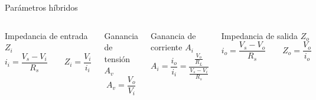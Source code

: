 \begin{frame}{Parámetros híbridos}
    \begin{columns}[t]
      \begin{block}{Impedancia de entrada $Z_i$}
        \[
          i_i = \frac{V_s - V_i}{R_s}
          \qquad
          Z_i = \frac{V_i}{i_i}
        \]
      \end{block}
    
      \begin{block}{Ganancia de tensión $A_v$}
        \[
          A_v = \frac{V_o}{V_i}
        \]
      \end{block}
    
      \begin{block}{Ganancia de corriente $A_i$}
        \[
          A_i = \frac{i_o}{i_i}
          = \frac{\tfrac{V_o}{R_L}}{\tfrac{V_s - V_i}{R_s}}
        \]
      \end{block}
    
      \begin{block}{Impedancia de salida $Z_o$}
        \[
          i_o = \frac{V_s - V_o}{R_s}
          \qquad
          Z_o = \frac{V_o}{i_o}
        \]
      \end{block}
    \end{columns}

\end{frame}





